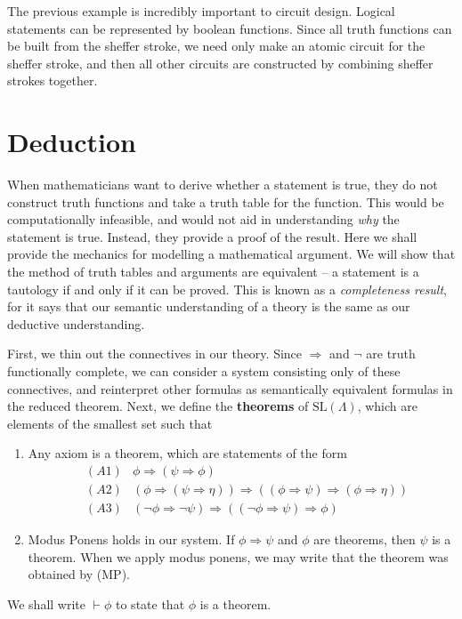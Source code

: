 The previous example is incredibly important to circuit design. Logical statements can be represented by boolean functions. Since all truth functions can be built from the sheffer stroke, we need only make an atomic circuit for the sheffer stroke, and then all other circuits are constructed by combining sheffer strokes together.




\section{Deduction}

When mathematicians want to derive whether a statement is true, they do not construct truth functions and take a truth table for the function. This would be computationally infeasible, and would not aid in understanding {\it why} the statement is true. Instead, they provide a proof of the result. Here we shall provide the mechanics for modelling a mathematical argument. We will show that the method of truth tables and arguments are equivalent -- a statement is a tautology if and only if it can be proved. This is known as a {\it completeness result}, for it says that our semantic understanding of a theory is the same as our deductive understanding.

First, we thin out the connectives in our theory. Since $\Rightarrow$ and $\neg$ are truth functionally complete, we can consider a system consisting only of these connectives, and reinterpret other formulas as semantically equivalent formulas in the reduced theorem. Next, we define the {\bf theorems} of $\text{SL}(\Lambda)$, which are elements of the smallest set such that
    \begin{enumerate}
        \item Any axiom is a theorem, which are statements of the form
        \begin{align*}
            &(A1) & \phi \Rightarrow (\psi \Rightarrow \phi)\\
            &(A2) & (\phi \Rightarrow (\psi \Rightarrow \eta)) \Rightarrow ((\phi \Rightarrow \psi) \Rightarrow (\phi \Rightarrow \eta))\\
            &(A3) & (\neg \phi \Rightarrow \neg \psi) \Rightarrow ((\neg \phi \Rightarrow \psi) \Rightarrow \phi)
        \end{align*}
        \item Modus Ponens holds in our system. If $\phi \Rightarrow \psi$ and $\phi$ are theorems, then $\psi$ is a theorem. When we apply modus ponens, we may write that the theorem was obtained by (MP).
    \end{enumerate}
We shall write $\vdash \phi$ to state that $\phi$ is a theorem.

